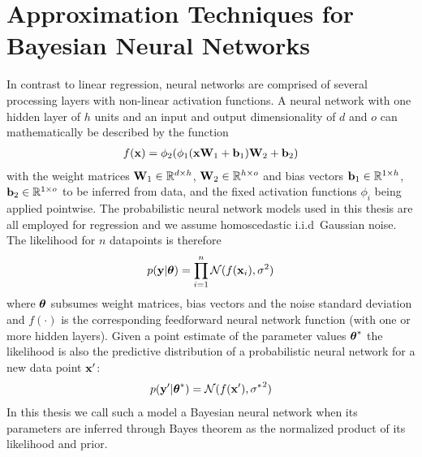 \documentclass[../thesis.tex]{subfiles}
\begin{document}
\section{Approximation Techniques for Bayesian Neural Networks}
\label{sec:bnn-approximation}
In contrast to linear regression, neural networks are comprised of several processing layers with non-linear activation functions. A neural network with one hidden layer of $h$ units and an input and output dimensionality of $d$ and $o$ can mathematically be described by the function
\begin{equation}
    \begin{split}
        f(\boldsymbol{\mathbf{x}}) = \phi_2(\phi_1(\boldsymbol{\mathbf{x}} \boldsymbol{\mathbf{W}}_1 + \boldsymbol{\mathbf{b}}_1) \boldsymbol{\mathbf{W}}_2 + \boldsymbol{\mathbf{b}}_2)
    \end{split}
\end{equation}
with the weight matrices $\boldsymbol{\mathbf{W}}_1 \in \mathbb{R}^{d \times h}$, $\boldsymbol{\mathbf{W}}_2 \in \mathbb{R}^{h \times o}$ and bias vectors $\boldsymbol{\mathbf{b}}_1 \in \mathbb{R}^{1 \times h}$, $\boldsymbol{\mathbf{b}}_2 \in \mathbb{R}^{1 \times o}$ to be inferred from data, and the fixed activation functions $\phi_i$ being applied pointwise.
The probabilistic neural network models used in this thesis are all employed for regression and we assume homoscedastic i.i.d\ Gaussian noise. The likelihood for $n$ datapoints is therefore
\begin{equation}
    \begin{split}
    p(\boldsymbol{\mathbf{y}} | \boldsymbol{\mathbf{\theta}}) = \prod_{i=1}^n \mathcal{N} (f(\boldsymbol{\mathbf{x}}_i), \sigma^2) 
    \end{split}
\end{equation}
where $\boldsymbol{\mathbf{\theta}}$ subsumes weight matrices, bias vectors and the noise standard deviation and $f({\cdot})$ is the corresponding feedforward neural network function (with one or more hidden layers). Given a point estimate of the parameter values $\boldsymbol{\mathbf{\theta}}^*$ the likelihood is also the predictive distribution of a probabilistic neural network for a new data point $\boldsymbol{\mathbf{x}}'$:
\begin{equation}
    \begin{split}
    p(\boldsymbol{\mathbf{y}}' | \boldsymbol{\mathbf{\theta}}^*) = \mathcal{N} (f(\boldsymbol{\mathbf{x}}'), {\sigma^{*}}^2) 
    \end{split}
\end{equation}
In this thesis we call such a model a Bayesian neural network when its parameters are inferred through Bayes theorem as the normalized product of its likelihood and prior.

\end{document}
